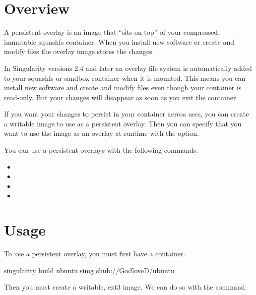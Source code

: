 \documentclass[letterpaper,10pt,english]{sphinxmanual}
\begin{document}
\section{Overview}
\label{\detokenize{persistent_overlays:overview}}
A persistent overlay is an image that “sits on top” of your
compressed, immutable squashfs container. When you install new
software or create and modify files the overlay image stores the
changes.

In Singularity versions 2.4 and later an overlay file system is
automatically added to your squashfs or sandbox container when it is
mounted. This means you can install new software and create and modify
files even though your container is read-only. But your changes will
disappear as soon as you exit the container.

If you want your changes to persist in your container across uses, you
can create a writable image to use as a persistent overlay. Then you
can specify that you want to use the image as an overlay at runtime
with the  option.

You can use a persistent overlays with the following commands:
\begin{itemize}
\item {} 

\item {} 

\item {} 

\item {} 

\end{itemize}


\section{Usage}
\label{\detokenize{persistent_overlays:usage}}
To use a persistent overlay, you must first have a container.

%
\begin{sphinxVerbatim}[commandchars=\\\{\}]
\PYGZdl{} singularity build ubuntu.simg shub://GodloveD/ubuntu
\end{sphinxVerbatim}

Then you must create a writable, ext3 image. We can do so with the 
command:
\end{document}
